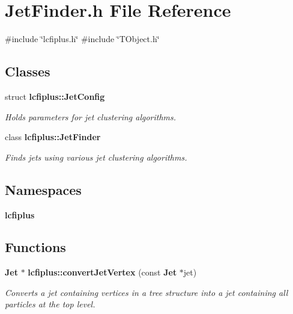 \section{Jet\+Finder.\+h File Reference}
\label{JetFinder_8h}
{\ttfamily \#include \char`\"{}lcfiplus.\+h\char`\"{}}\newline
{\ttfamily \#include \char`\"{}T\+Object.\+h\char`\"{}}\newline
\subsection*{Classes}
\begin{DoxyCompactItemize}
\item 
struct \textbf{ lcfiplus\+::\+Jet\+Config}
\begin{DoxyCompactList}\small\item\em Holds parameters for jet clustering algorithms. \end{DoxyCompactList}\item 
class \textbf{ lcfiplus\+::\+Jet\+Finder}
\begin{DoxyCompactList}\small\item\em Finds jets using various jet clustering algorithms. \end{DoxyCompactList}\end{DoxyCompactItemize}
\subsection*{Namespaces}
\begin{DoxyCompactItemize}
\item 
 \textbf{ lcfiplus}
\end{DoxyCompactItemize}
\subsection*{Functions}
\begin{DoxyCompactItemize}
\item 
\textbf{ Jet} $\ast$ \textbf{ lcfiplus\+::convert\+Jet\+Vertex} (const \textbf{ Jet} $\ast$jet)
\begin{DoxyCompactList}\small\item\em Converts a jet containing vertices in a tree structure into a jet containing all particles at the top level. \end{DoxyCompactList}\end{DoxyCompactItemize}
